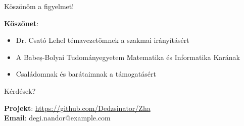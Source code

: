 \documentclass[aspectratio=169]{beamer}
\begin{document}
\begin{frame}{}
\begin{center}
{\Large Köszönöm a figyelmet!}

\vspace{2em}

\textbf{Köszönet}:
\begin{itemize}
    \item Dr. Csató Lehel témavezetőmnek a szakmai irányításért
    \item A Babeș-Bolyai Tudományegyetem Matematika és Informatika Karának
    \item Családomnak és barátaimnak a támogatásért
\end{itemize}

\vspace{2em}

{\large Kérdések?}

\vspace{1em}

\footnotesize
\textbf{Projekt}: \url{https://github.com/Dedzsinator/Zha}\\
\textbf{Email}: degi.nandor@example.com
\end{center}
\end{frame}
\end{document}
